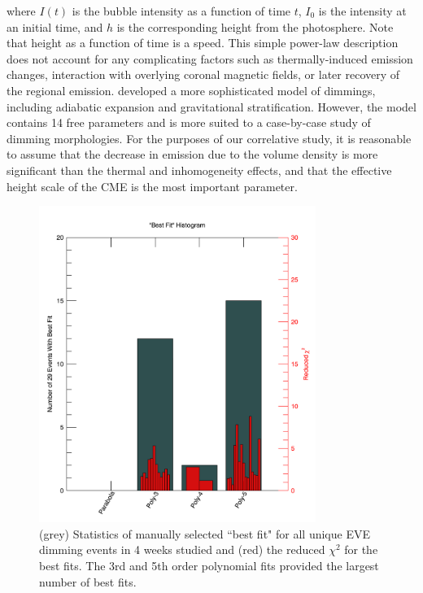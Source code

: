 \noindent where $I(t)$ is the bubble intensity as a function of time $t$, $I_0$ is the intensity at an initial time, and $h$ is the corresponding height from the photosphere. Note that height as a function of time is a speed. This simple power-law description does not account for any complicating factors such as thermally-induced emission changes, interaction with overlying coronal magnetic fields, or later recovery of the regional emission. \citet{Aschwanden2009b} developed a more sophisticated model of dimmings, including adiabatic expansion and gravitational stratification. However, the model contains 14 free parameters and is more suited to a case-by-case study of dimming morphologies. For the purposes of our correlative study, it is reasonable to assume that the decrease in emission due to the volume density is more significant than the thermal and inhomogeneity effects, and that the effective height scale of the CME is the most important parameter. 

\begin{figure}[!h]
    \begin{center}
	    \includegraphics[width=90mm]{Images/BestFitHistogram.png}
    \end{center}
    \caption[Dimming best fit statistics]{
        (grey) Statistics of manually selected ``best fit" for all unique EVE dimming events in 4 weeks studied and 
        (red) the reduced $\chi^2$ for the best fits. The 3rd and 5th order polynomial fits provided the largest number
        of best fits.
    }
    \label{fig:bestfithistogram}
\end{figure}


